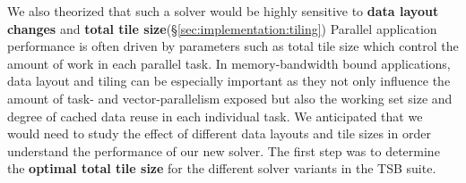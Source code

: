 \documentclass{sig-alternate-05-2015}
\begin{document}
We also theorized that such a solver would be highly sensitive to
  \textbf{data layout changes} and
  \textbf{total tile size}(\S\ref{sec:implementation:tiling})
Parallel application performance is often driven by parameters such as total
  tile size which control the amount of work in each parallel task.
In memory-bandwidth bound applications, data layout and tiling can be
  especially important as they not only influence the amount of task- and
  vector-parallelism exposed but also the working set size and degree of cached
  data reuse in each individual task.
We anticipated that we would need to study the effect of different data layouts
  and tile sizes in order understand the performance of our new solver.
The first step was to determine the \textbf{optimal total tile size} for the 
  different solver variants in the TSB suite.

\end{document}
